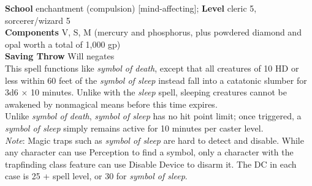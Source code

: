 \textbf{School} enchantment (compulsion) [mind-affecting]; \textbf{Level} cleric 5, sorcerer/wizard 5\\
\textbf{Components} V, S, M (mercury and phosphorus, plus powdered diamond and opal worth a total of 1,000 gp)\\
\textbf{Saving Throw }Will negates\\
This spell functions like \textit{symbol of death}, except that all creatures of 10 HD or less within 60 feet of the \textit{symbol of sleep }instead fall into a catatonic slumber for 3d6 × 10 minutes. Unlike with the \textit{sleep }spell, sleeping creatures cannot be awakened by nonmagical means before this time expires.\\
Unlike \textit{symbol of death}, \textit{symbol of sleep }has no hit point limit; once triggered, a \textit{symbol of sleep }simply remains active for 10 minutes per caster level.\\
\textit{Note}: Magic traps such as \textit{symbol of sleep }are hard to detect and disable. While any character can use Perception to find a symbol, only a character with the trapfinding class feature can use Disable Device to disarm it. The DC in each case is 25 + spell level, or 30 for \textit{symbol of sleep}.\\
